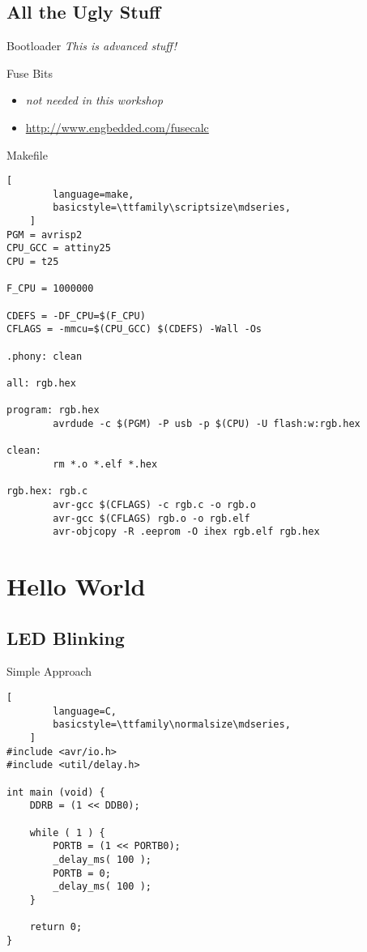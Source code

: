 \documentclass{beamer}
\begin{document}
\subsection{All the Ugly Stuff}

\begin{frame}{Bootloader}
    \emph{This is advanced stuff!}
\end{frame}

\begin{frame}{Fuse Bits}
    \begin{itemize}
        \item \emph{not needed in this workshop}
        \pause
        \item \url{http://www.engbedded.com/fusecalc}
    \end{itemize}
\end{frame}

\begin{frame}[fragile]{Makefile}
    \begin{lstlisting}[
        language=make,
        basicstyle=\ttfamily\scriptsize\mdseries,
    ]
PGM = avrisp2
CPU_GCC = attiny25
CPU = t25

F_CPU = 1000000

CDEFS = -DF_CPU=$(F_CPU)
CFLAGS = -mmcu=$(CPU_GCC) $(CDEFS) -Wall -Os

.phony: clean

all: rgb.hex

program: rgb.hex
        avrdude -c $(PGM) -P usb -p $(CPU) -U flash:w:rgb.hex

clean:
        rm *.o *.elf *.hex

rgb.hex: rgb.c
        avr-gcc $(CFLAGS) -c rgb.c -o rgb.o
        avr-gcc $(CFLAGS) rgb.o -o rgb.elf
        avr-objcopy -R .eeprom -O ihex rgb.elf rgb.hex
    \end{lstlisting}
\end{frame}

\section{Hello World}

\subsection{LED Blinking}

\begin{frame}[fragile]{Simple Approach}
    \begin{lstlisting}[
        language=C,
        basicstyle=\ttfamily\normalsize\mdseries,
    ]
#include <avr/io.h>
#include <util/delay.h>

int main (void) {
    DDRB = (1 << DDB0);

    while ( 1 ) {
        PORTB = (1 << PORTB0);
        _delay_ms( 100 );
        PORTB = 0;
        _delay_ms( 100 );
    }

    return 0;
}
    \end{lstlisting}
\end{frame}
\end{document}
